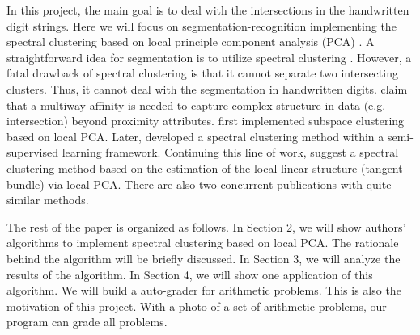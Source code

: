 In this project, the main goal is to deal with the intersections in the handwritten digit strings. Here we will focus on segmentation-recognition implementing the spectral clustering based on local principle component analysis (PCA) \citep{arias2017}. A straightforward idea for segmentation is to utilize spectral clustering \citep{ng2002}. However, a fatal drawback of spectral clustering is that it cannot separate two intersecting clusters. Thus, it cannot deal with the segmentation in handwritten digits. \citet{shashua2006} claim that a multiway affinity is needed to capture complex structure in data (e.g. intersection) beyond proximity attributes. \citet{fan2006} first implemented subspace clustering based on local PCA. Later, \citet{goldberg2009} developed a spectral clustering method within a semi-supervised learning framework. Continuing this line of work, \citep{arias2011} suggest a spectral clustering method based on the estimation of the local linear structure (tangent bundle) via local PCA. There are also two concurrent publications \citep{wang2011, gong2012} with quite similar methods.

The rest of the paper is organized as follows. In Section 2, we will show authors' algorithms to implement spectral clustering based on local PCA.  The rationale behind the algorithm will be briefly discussed. In Section 3, we will analyze the results of the algorithm. In Section 4, we will show one application of this algorithm. We will build a auto-grader for arithmetic problems. This is also the motivation of this project. With a photo of a set of arithmetic problems, our program can grade all problems.  

